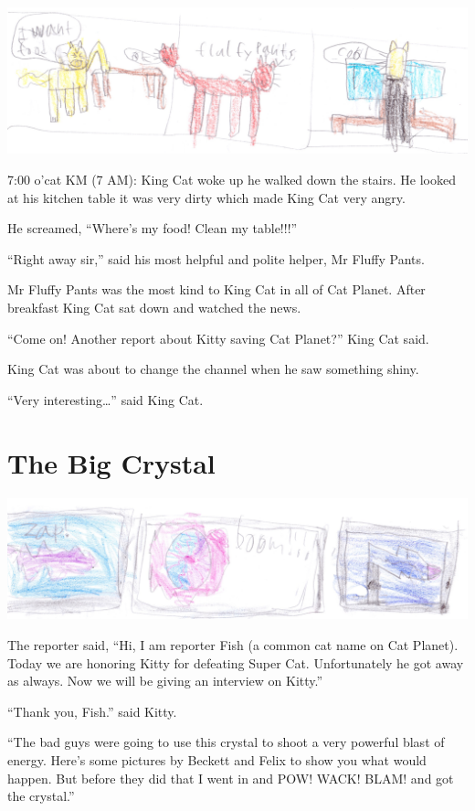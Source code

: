 \documentclass[]{krantz}
\begin{document}
\includegraphics{img/fluffypants.jpg}

7:00 o'cat KM (7 AM): King Cat woke up he walked down the stairs. He
looked at his kitchen table it was very dirty which made King Cat very
angry.

He screamed, ``Where's my food! Clean my table!!!''

``Right away sir,'' said his most helpful and polite helper, Mr Fluffy
Pants.

Mr Fluffy Pants was the most kind to King Cat in all of Cat Planet.
After breakfast King Cat sat down and watched the news.

``Come on! Another report about Kitty saving Cat Planet?'' King Cat
said.

King Cat was about to change the channel when he saw something shiny.

``Very interesting\ldots{}'' said King Cat.

\hypertarget{the-big-crystal}{%
\chapter{The Big Crystal}\label{the-big-crystal}}

\includegraphics{img/boom.jpg}

The reporter said, ``Hi, I am reporter Fish (a common cat name on Cat
Planet). Today we are honoring Kitty for defeating Super Cat.
Unfortunately he got away as always. Now we will be giving an interview
on Kitty.''

``Thank you, Fish.'' said Kitty.

``The bad guys were going to use this crystal to shoot a very powerful
blast of energy. Here's some pictures by Beckett and Felix to show you
what would happen. But before they did that I went in and POW! WACK!
BLAM! and got the crystal.''
\end{document}
